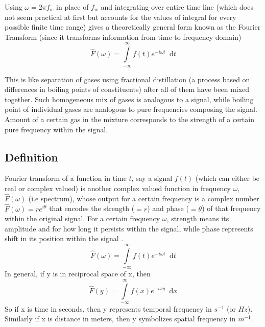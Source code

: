 \documentclass[11pt, a4paper]{article}
\newcommand{\diff}{\mathop{}\!\mathrm{d}}
\newcommand{\dx}{\diff x}
\newcommand{\dt}{\diff t}
\newcommand{\dint}[2]{\int \limits_{#1}^{#2}}  %
\newcommand{\intinfty}{\dint{-\infty}{\infty}}	%
\begin{document}
	Using $\omega = 2\pi f_{w}$ in place of $f_{w}$ and integrating over entire time line (which does not seem practical at first but accounts for the values of integral for every possible finite time range) gives a theoretically general form known as the Fourier Transform (since it transforms information from time to frequency domain)
	\begin{equation}\label{eq:com.wrapped_signal.FT_final}
		\hat{F}(\omega) = \intinfty f(t)e^{-i\omega t} \dt
	\end{equation}
	
	This is like separation of gases using fractional distillation (a process based on differences in boiling points of constituents) after all of them have been mixed together. Such homogeneous mix of gases is analogous to a signal, while boiling point of individual gases are analogous to pure frequencies composing the signal. Amount of a certain gas in the mixture corresponds to the strength of a certain pure frequency within the signal. 
	
	\subsection{Definition}\label{sec:fourier_transform_def}  %
	Fourier transform of a function in time $t$, say a signal $f(t)$ (which can either be real or complex valued) is another complex valued function in frequency $\omega$, $\hat{F}(\omega)$ (i.e spectrum), whose output for a certain frequency is a complex number $\hat{F}(\omega)=re^{i\theta}$ that encodes the strength ($=r$) and phase ($=\theta$) of that frequency within the original signal. For a certain frequency $\omega$, strength means its amplitude and for how long it persists within the signal, while phase represents shift in its position within the signal \cite{herman2016fourieranalysis}.
	\begin{equation}\label{eq:ft_def}
		\boxed{
			\hat{F}(\omega) = \intinfty f(t)e^{-i\omega t} \dt
		}
	\end{equation}
	In general, if y is in reciprocal space of x, then
	\begin{equation*}\label{eq:ft_def_general}
		\hat{F}(y) = \intinfty f(x)e^{-ixy} \dx
	\end{equation*}
	So if x is time in seconds, then y represents temporal frequency in $s^{-1}$ (or $Hz$). Similarly if x is distance in meters, then y symbolizes spatial frequency in $m^{-1}$.
	
\end{document}
